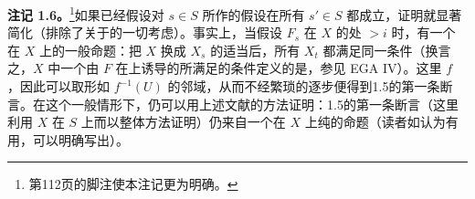 \textbf{注记 1.6。}\footnote{第112页的脚注使本注记更为明确。}如果已经假设对 $s\in S$ 所作的假设在所有 $s'\in S$ 都成立，证明就显著简化（排除了关于的一切考虑）。事实上，当假设 $F_s$ 在 $X$ 的处 $>i$ 时，有一个在 $X$ 上的一般命题：把 $X$ 换成 $X_s$ 的适当后，所有 $X_t$ 都满足同一条件（换言之，$X$ 中一个由 $F$ 在上诱导的所满足的条件定义的是，参见 EGA IV）。这里 $f$ ，因此可以取形如 $f^{-1}(U)$ 的邻域，从而不经繁琐的逐步便得到1.5的第一条断言。在这个一般情形下，仍可以用上述文献的方法证明：1.5的第一条断言（这里利用 $X$ 在 $S$ 上而以整体方法证明）仍来自一个在 $X$ 上纯的命题（读者如认为有用，可以明确写出）。

